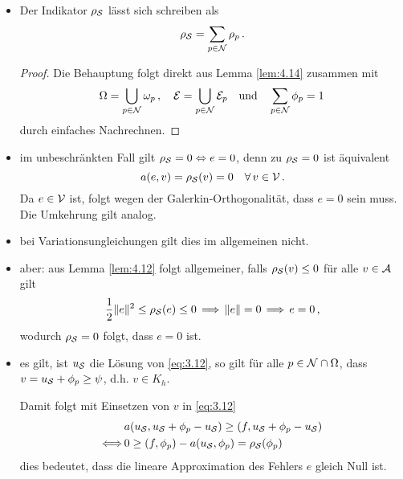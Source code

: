 \begin{itemize}
\begin{proof}
\begin{figure}[h]
\caption{Darstellung von $\omega_p$ und $\mcal E_p$ für ein beliebiges $\phi_p$}
\end{figure}
\end{proof}

\item 
\begin{kor}
Der Indikator $\rho_{\mathcal S}$ lässt sich schreiben als
\[
	\rho_{\mathcal S} = \sum_{p \in \mathcal N} \rho_p \, .
\]
\end{kor}

\begin{proof}
Die Behauptung folgt direkt aus Lemma \ref{lem:4.14} zusammen mit
\[
	\Omega = \bigcup_{p\in \mathcal N} \omega_p \, , \quad \mathcal E = \bigcup_{p \in \mathcal N} \mathcal E_p \quad \text{und}\quad \sum_{p \in \mathcal N} \phi_p = 1 \, 
\]
durch einfaches Nachrechnen.
\end{proof}

\item im unbeschränkten Fall gilt $\rho_{\mathcal S} = 0 \Leftrightarrow e = 0$, denn zu $\rho_{\mathcal S} = 0$ ist äquivalent
\[
	a(e,v) = \rho_{\mathcal S}(v) = 0 \quad \forall \, v \in \mathcal V\, .
\]
Da $e\in \mathcal V$ ist, folgt wegen der Galerkin-Orthogonalität, dass $e=0$ sein muss. Die Umkehrung gilt analog.

\item bei Variationsungleichungen gilt dies im allgemeinen nicht.

\item aber: aus Lemma \ref{lem:4.12} folgt allgemeiner, falls $\rho_{\mathcal S} (v) \le 0$ für alle $v \in \mathcal A$ gilt
\[
	\frac 12 \lVert e\rVert^2 \le \rho_{\mathcal S}(e) \le 0\,  \Longrightarrow\,  \lVert e\rVert = 0 \, \Longrightarrow\, e = 0 \, ,
\]
wodurch $\rho_{\mathcal S} = 0$ folgt, dass $e = 0$ ist.

\item es gilt, ist $u_{\mathcal S}$ die Lösung von \eqref{eq:3.12}, so gilt für alle $p \in \mathcal N \cap \Omega$, dass $v = u_{\mathcal S} + \phi_p  \ge \psi$, d.h. $v \in K_h$.

Damit folgt mit Einsetzen von $v$ in  \eqref{eq:3.12}
\begin{align}\notag
	&a(u_{\mathcal S}, u_{\mathcal S} + \phi_p - u_{\mathcal S}) \ge (f,u_{\mathcal S}+\phi_p-u_{\mathcal S}) \\
	\label{eq:4.20}
	\Longleftrightarrow \,  & 0 \ge (f,\phi_p)-a(u_{\mathcal S},\phi_p) = \rho_{\mathcal S}(\phi_p)
\end{align}
dies bedeutet, dass die lineare Approximation des Fehlers $e$ gleich Null ist.


\end{itemize}
